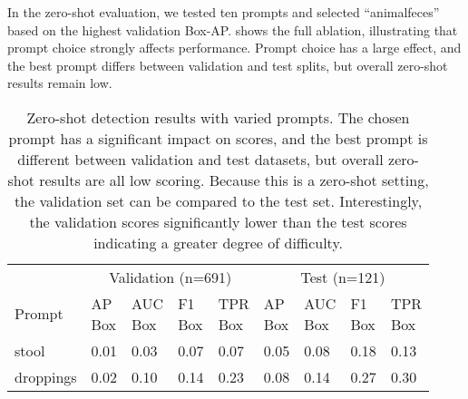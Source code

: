 In the zero-shot evaluation, we tested ten prompts and selected ``animalfeces'' based on the highest
  validation Box-AP.
 shows the full ablation, illustrating that prompt choice strongly affects
  performance.
Prompt choice has a large effect, and the best prompt differs between validation and test splits, but
  overall zero-shot results remain low.



\begin{table}[t]
\caption{Zero-shot detection results with varied prompts. The chosen prompt has a significant impact on scores, and the best prompt is different between validation and test datasets, but overall zero-shot results are all low scoring. Because this is a zero-shot setting, the validation set can be compared to the test set. Interestingly, the validation scores significantly lower than the test scores indicating a greater degree of difficulty. }
\label{tab:prompt_variations}
\centering
\begin{tabular}{lllllllll}
\toprule
\multicolumn{1}{l}{} & \multicolumn{4}{c}{Validation (n=691)} & \multicolumn{4}{c}{Test (n=121)} \\
 Prompt      & \makecell{AP\\Box}   & \makecell{AUC\\Box}   & \makecell{F1\\Box}   & \makecell{TPR\\Box}   & \makecell{AP\\Box}   & \makecell{AUC\\Box}   & \makecell{F1\\Box}   & \makecell{TPR\\Box}   \\
\midrule
 stool       & 0.01                 & 0.03                  & 0.07                 & 0.07                  & 0.05                 & 0.08                  & 0.18                 & 0.13                  \\
 droppings   & 0.02                 & 0.10                  & 0.14                 & 0.23                  & 0.08                 & 0.14                  & 0.27                 & 0.30                  \\

\end{tabular}
\end{table}
